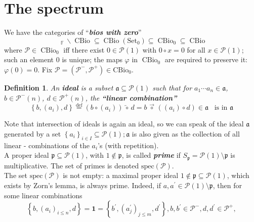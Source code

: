 \documentclass[leqno]{article}
\newcommand{\pid}{\mathfrak{p}}
\newcommand{\oneideal}{\mathfrak{a}}
\newcommand{\myemph}[1]{{\it{\bf{#1}}}}
\newcommand{\unit}{{\mathbf{1}}}
\newcommand{\F}{\mathbb{F}}
\newcommand{\biop}{\mathscr{P}}
\newcommand{\circleftarrow}{\,\overleftarrow{\circ}\,}
\newcommand{\circrightarrow}{\,\overrightarrow{\circ}\,}
\DeclareMathOperator{\cbio}{CBio}
\newtheorem{definition}[equation]{Definition} %
\numberwithin{equation}{section}
\begin{document}
\section{The spectrum} \label{sec:5}
We have the categories of ``\myemph{bios with zero}''
\begin{equation}
				\phantom{*}_\F \backslash\cbio \subseteq\cbio(\text{Set}_{0})\subseteq\cbio_{0}\subseteq\cbio
				\label{eq:5.1}
\end{equation}
where $\biop\in \cbio_0$ iff there exist $0\in\biop(1)$ with $0\circ x=0$ for all
$x\in \biop(1)$; such an element $0$ is unique; the maps $\varphi$ in $\cbio_0$ are required
to preserve it: $\varphi(0)=0$. 
Fix $\biop=(\biop^{-},\biop^{+})\in \text{CBio}_{0}$. 
\begin{definition}
				An \myemph{ideal} is a subset $\oneideal\subseteq\biop(1)$ such that for
				$a_{1}\cdots a_{n}\in \oneideal$, $b\in \biop^{-}(n)$, $d\in\biop^{+}(n)$, the
				\myemph{``linear combination''} 
				\begin{equation}
								\left\{ b,(a_{i}), d  \right\}\overset{\text{def}}{=} \left( b\circ
												(a_{i})
								\right)\circleftarrow d = b\circrightarrow \left( (a_{i})\circ d \right)\in
				\oneideal \;\;\; \text{is in $\oneideal $}
								\label{eq:5.3}
				\end{equation}
				\label{def:5.2}
\end{definition} \vspace{-5mm}
\noindent Note that intersection of ideals is again an ideal, so we can speak of the ideal $\oneideal$
generated by a set $\left\{ a_{i} \right\}_{i\in I}\subseteq\biop(1);\oneideal$ is also given as
the collection of all linear - combinations of the $a_{i}$'s (with repetition). \\
A proper ideal $\pid\subseteq\biop(1)$, with $1\not\in \pid$, is called \myemph{prime} if
$S_{\pid}=\biop(1)\setminus \pid$ is multiplicative. The set of primes is denoted
$\text{spec}(\biop)$.  \\
The set $\text{spec}(\biop)$ is not empty: a maximal proper ideal $1\not\in
\pid\subseteq\biop(1)$, which exists by Zorn's lemma, is always prime. Indeed, if
$a,a^{\prime}\in \biop(1)\setminus \pid$, then for some linear combinations 
\begin{equation*}
				\left\{ b,(a_{i})_{i\le n}, d \right\}=\unit = \left\{
				b^{\prime},(a^{\prime}_{j})_{j\le m},d^{\prime} \right\},b,b^{\prime}\in
				\biop^{-}, d,d^{\prime}\in\biop^{+}, 
\end{equation*}
\end{document}
